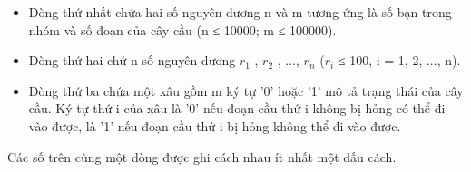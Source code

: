 \begin{itemize}
	\item Dòng thứ nhất chứa hai số nguyên dương n và m tương ứng là số bạn trong nhóm và số đoạn của cây cầu (n ≤ 10000; m ≤ 100000).
	\item Dòng thứ hai chứ n số nguyên dương $r_{1}$ , $r_{2}$ , ..., $r_{n}$ ($r_{i}$ ≤ 100, i = 1, 2, ..., n).
	\item Dòng thứ ba chứa một xâu gồm m ký tự '0' hoặc '1' mô tả trạng thái của cây cầu. Ký tự thứ i của xâu là '0' nếu đoạn cầu thứ i không bị hỏng có thể đi vào được, là '1' nếu đoạn cầu thứ i bị hỏng không thể đi vào được.
\end{itemize}

Các số trên cùng một dòng được ghi cách nhau ít nhất một dấu cách.